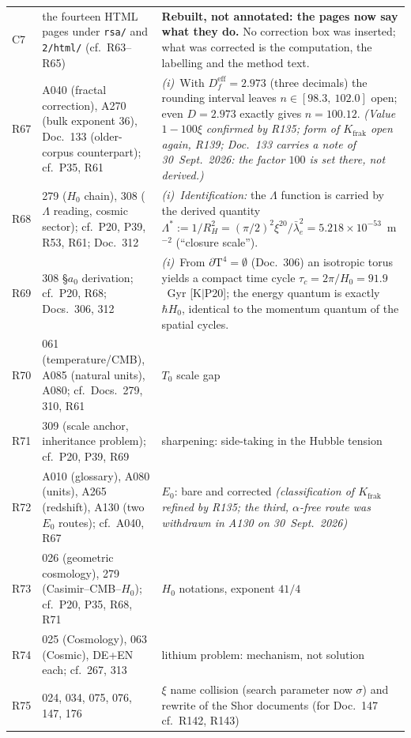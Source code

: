 \begin{longtable}{@{}p{0.9cm}p{3.1cm}p{10.2cm}@{}}
C7 & the fourteen HTML pages under \texttt{rsa/} and \texttt{2/html/} (cf.\ R63--R65) & \textbf{Rebuilt, not annotated: the pages now say what they do.} No correction box was inserted; what was corrected is the computation, the labelling and the method text. \\
R67 & A040 (fractal correction), A270 (bulk exponent 36), Doc.~133 (older-corpus counterpart); cf.\ P35, R61 & \emph{(i)}~With $D_f^\text{eff} = 2.973$ (three decimals) the rounding interval leaves $n \in [98.3,\ 102.0]$ open; even $D = 2.973$ exactly gives $n = 100.12$. \emph{(Value $1-100\xi$ confirmed by R135; form of $K_{\mathrm{frak}}$ open again, R139; Doc.~133 carries a note of 30~Sept.~2026: the factor $100$ is set there, not derived.)} \\
R68 & 279 ($H_0$ chain), 308 ($\Lambda$ reading, cosmic sector); cf.\ P20, P39, R53, R61; Doc.~312 & \emph{(i)~Identification:} the $\Lambda$ function is carried by the derived quantity $\Lambda^{*} := 1/R_H^2 = (\pi/2)^2\xi^{20}/ \bar\lambda_e^2 = 5.218\times10^{-53}$~m$^{-2}$ (\enquote{closure scale}). \\
R69 & 308 \S{}$a_0$ derivation; cf.\ P20, R68; Docs.~306, 312 & \emph{(i)}~From $\partial\text{T}^4 = \emptyset$ (Doc.~306) an isotropic torus yields a compact time cycle $\tau_c = 2\pi/H_0 = 91.9$~Gyr [K$|$P20]; the energy quantum is exactly $\hbar H_0$, identical to the momentum quantum of the spatial cycles. \\
R70 & 061 (temperature/CMB), A085 (natural units), A080; cf.\ Docs.~279, 310, R61 & $T_0$ scale gap \\
R71 & 309 (scale anchor, inheritance problem); cf.\ P20, P39, R69 & sharpening: side-taking in the Hubble
tension \\
R72 & A010 (glossary), A080 (units), A265 (redshift), A130 (two $E_0$ routes); cf.\ A040, R67 & $E_0$: bare and
corrected \emph{(classification of $K_{\mathrm{frak}}$ refined by R135; the third, $\alpha$-free route was withdrawn in A130 on 30~Sept.~2026)} \\
R73 & 026 (geometric cosmology), 279 (Casimir--CMB--$H_0$); cf.\ P20, P35, R68, R71 & $H_0$ notations, exponent $41/4$ \\
R74 & 025 (Cosmology), 063 (Cosmic), DE+EN each; cf.\ 267, 313 & lithium problem: mechanism,
not solution \\
R75 & 024, 034, 075, 076, 147, 176 & $\xi$ name collision (search parameter now $\sigma$) and rewrite of the Shor documents (for Doc.~147 cf.\ R142, R143) \\

\end{longtable}
